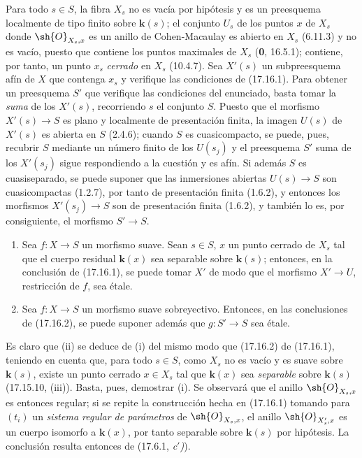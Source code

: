 Para todo $s\in S$, la fibra $X_s$ no es vacía por hipótesis y es un preesquema localmente de tipo finito sobre $\boldsymbol{k}(s)$; el conjunto $U_s$ de los puntos $x$ de $X_s$ donde $\sh{O}_{X_s,x}$ es un anillo de Cohen-Macaulay es abierto en $X_s$ (6.11.3) y no es vacío, puesto que contiene los puntos maximales de $X_s$ (\textbf 0, 16.5.1); contiene, por tanto, un punto $x_s$ \emph{cerrado} en $X_s$ (10.4.7). Sea $X'(s)$ un subpreesquema afín de $X$ que contenga $x_s$ y verifique las condiciones de (17.16.1). Para obtener un preesquema $S'$ que verifique las condiciones del enunciado, basta tomar la \emph{suma} de los $X'(s)$, recorriendo $s$ el conjunto $S$. Puesto que el morfismo $X'(s)\to S$ es plano y localmente de presentación finita, la imagen $U(s)$ de $X'(s)$ es abierta en $S$ (2.4.6); cuando $S$ es cuasicompacto, se puede, pues, recubrir $S$ mediante un número finito de los $U(s_j)$ y el preesquema $S'$ suma de los $X'(s_j)$ sigue respondiendo a la cuestión y es afín. Si además $S$ es cuasiseparado, se puede suponer que las inmersiones abiertas $U(s)\to S$ son cuasicompactas (1.2.7), por tanto de presentación finita (1.6.2), y entonces los morfismos $X'(s_j)\to S$ son de presentación finita (1.6.2), y también lo es, por consiguiente, el morfismo $S'\to S$.

\begin{corollary}[17.16.3]
\label{IV.17.16.3}
\begin{enumerate}
  \item[\textup{(i)}] Sea $f:X\to S$ un morfismo suave. Sean $s\in S$, $x$ un punto cerrado de $X_s$ tal que el cuerpo residual $\boldsymbol{k}(x)$ sea separable sobre $\boldsymbol{k}(s)$; entonces, en la conclusión de \textup{(17.16.1)}, se puede tomar $X'$ de modo que el morfismo $X'\to U$, restricción de $f$, sea étale.
  \item[\textup{(ii)}] Sea $f:X\to S$ un morfismo suave sobreyectivo. Entonces, en las conclusiones de \textup{(17.16.2)}, se puede suponer además que $g:S'\to S$ sea étale.
\end{enumerate}
\end{corollary}

Es claro que (ii) se deduce de (i) del mismo modo que (17.16.2) de (17.16.1), teniendo en cuenta que, para todo $s\in S$, como $X_s$ no es vacío y es suave sobre $\boldsymbol{k}(s)$, existe un punto cerrado $x\in X_s$ tal que $\boldsymbol{k}(x)$ sea \emph{separable} sobre $\boldsymbol{k}(s)$ (17.15.10, (iii)). Basta, pues, demostrar (i). Se observará que el anillo $\sh{O}_{X_s,x}$ es entonces regular; si se repite la construcción hecha en (17.16.1) tomando para $(t_i)$ un \emph{sistema regular de parámetros} de $\sh{O}_{X_s,x}$, el anillo $\sh{O}_{X'_s,x}$ es un cuerpo isomorfo a $\boldsymbol{k}(x)$, por tanto separable sobre $\boldsymbol{k}(s)$ por hipótesis. La conclusión resulta entonces de (17.6.1, \emph{c$'$)}).

